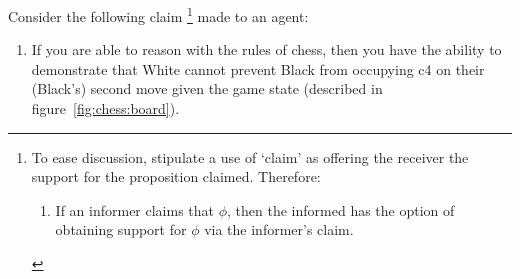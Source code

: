 \documentclass[10pt]{article}
\begin{document}
Consider the following claim\nolinebreak
\footnote{
  To ease discussion, stipulate a use of `claim' as offering the receiver the support for the proposition claimed.
  Therefore:
  \begin{enumerate}
  \item\label{cond:claim-to-opt-supp} If an informer claims that \(\phi\), then the informed has the option of obtaining support for \(\phi\) via the informer's claim.
  \end{enumerate}\vspace{-10pt}
}\nolinebreak
made to an agent:
\begin{enumerate}
\item\label{chess:claim:1}\label{chess:claim:1:conditional} If you are able to reason with the rules of chess, then you have the ability to demonstrate that White cannot prevent Black from occupying c4 on their (Black's) second move given the game state (described in figure~\ref{fig:chess:board}).
\end{enumerate}
\end{document}
